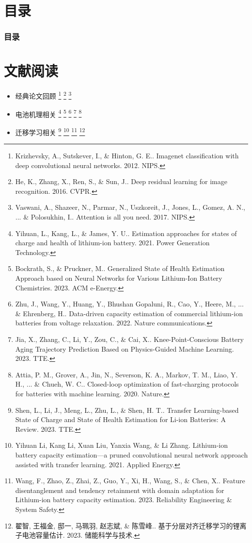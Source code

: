 \documentclass[10pt,aspectratio=43,mathserif]{beamer}
\title[汇报]{\fontsize{13pt}{18pt}\selectfont {汇报}}
\author[林新辉]{林新辉 \\\medskip}
\date[\today]{
 \today}
\begin{document}
\begin{frame}
  \titlepage
\end{frame}

\section*{目录}
\begin{frame}
  \frametitle{\textbf{目录}}
  \textbf{\tableofcontents}
\end{frame}

\section{文献阅读}

\begin{frame}
  \begin{itemize}
    \item 经典论文回顾
    \footnote{Krizhevsky, A., Sutskever, I., \& Hinton, G. E.. Imagenet classification with deep convolutional neural networks. 2012. NIPS.}
    \footnote{He, K., Zhang, X., Ren, S., \& Sun, J.. Deep residual learning for image recognition. 2016. CVPR.}
    \footnote{Vaswani, A., Shazeer, N., Parmar, N., Uszkoreit, J., Jones, L., Gomez, A. N., ... \& Polosukhin, I.. Attention is all you need. 2017. NIPS.}
    
    \item 电池机理相关
    \footnote{Yihuan, L., Kang, L., \& James, Y. U.. Estimation approaches for states of charge and health of lithium-ion battery. 2021. Power Generation Technology.}
    \footnote{Bockrath, S., \& Pruckner, M.. Generalized State of Health Estimation Approach based on Neural Networks for Various Lithium-Ion Battery Chemistries. 2023. ACM e-Energy.}
    \footnote{Zhu, J., Wang, Y., Huang, Y., Bhushan Gopaluni, R., Cao, Y., Heere, M., ... \& Ehrenberg, H.. Data-driven capacity estimation of commercial lithium-ion batteries from voltage relaxation. 2022. Nature communications.}
    \footnote{Jia, X., Zhang, C., Li, Y., Zou, C., \& Cai, X.. Knee-Point-Conscious Battery Aging Trajectory Prediction Based on Physics-Guided Machine Learning. 2023. TTE.}
    \footnote{Attia, P. M., Grover, A., Jin, N., Severson, K. A., Markov, T. M., Liao, Y. H., ... \& Chueh, W. C.. Closed-loop optimization of fast-charging protocols for batteries with machine learning. 2020. Nature.}

    \item 迁移学习相关
    \footnote{Shen, L., Li, J., Meng, L., Zhu, L., \& Shen, H. T.. Transfer Learning-based State of Charge and State of Health Estimation for Li-ion Batteries: A Review. 2023. TTE.}
    \footnote{Yihuan Li, Kang Li, Xuan Liu, Yanxia Wang, \& Li Zhang. Lithium-ion battery capacity estimation—a pruned convolutional neural network approach assisted with transfer learning. 2021. Applied Energy.}
    \footnote{Wang, F., Zhao, Z., Zhai, Z., Guo, Y., Xi, H., Wang, S., \& Chen, X.. Feature disentanglement and tendency retainment with domain adaptation for Lithium-ion battery capacity estimation. 2023. Reliability Engineering \& System Safety.}
    \footnote{翟智, 王福金, 邸一, 马珮羽, 赵志斌, \& 陈雪峰.. 基于分层对齐迁移学习的锂离子电池容量估计. 2023. 储能科学与技术.}
    

\end{itemize}
\end{frame}
\end{document}
